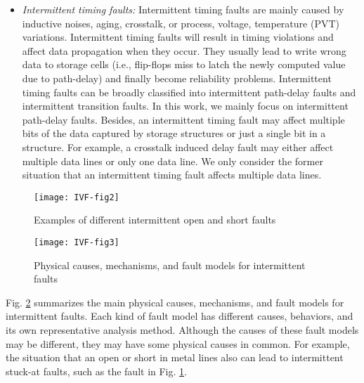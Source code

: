 \begin{itemize}
    \item \textit{Intermittent timing faults:} Intermittent timing faults are mainly caused by inductive noises, aging, crosstalk, or process, voltage, temperature (PVT) variations. Intermittent timing faults will result in timing violations and affect data propagation when they occur. They usually lead to write wrong data to storage cells (i.e., flip-flops miss to latch the newly computed value due to path-delay) and finally become reliability problems. Intermittent timing faults can be broadly classified into intermittent path-delay faults and intermittent transition faults. In this work, we  mainly focus on intermittent path-delay faults. Besides, an intermittent timing fault may affect multiple bits of the data captured by storage structures or just a single bit in a structure. For example, a crosstalk induced delay fault may either affect multiple data lines or only one data line. We only consider the former situation that an intermittent timing fault affects multiple data lines.
\end{itemize}

\begin{figure}[t]
\centering
\texttt{[image: IVF-fig2]}
\caption{Examples of different intermittent open and short faults}
\label{fig:open-short-faults} 
\end{figure}

\begin{figure}[t]
\centering
\texttt{[image: IVF-fig3]}
\caption{Physical causes, mechanisms, and fault models for intermittent faults}
\label{fig:fault-cause} 
\end{figure}


Fig. \ref{fig:fault-cause} summarizes the main physical causes, mechanisms, and fault models for intermittent faults. Each kind of fault model has different causes, behaviors, and its own representative analysis method. Although the causes of these fault models may be different, they may have some physical causes in common. For example, the situation that an open or short in metal lines also can lead to intermittent stuck-at faults, such as the fault in Fig. \ref{fig:open-short-faults}.

